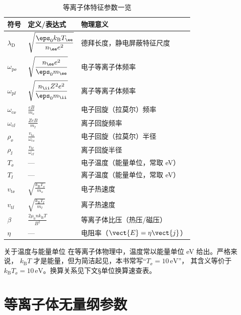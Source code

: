 \begin{table}[htbp]
\centering
\caption{等离子体特征参数一览}
\begin{tabular}{@{}llp{6.5cm}@{}}
\toprule
\textbf{符号} & \textbf{定义/表达式} & \textbf{物理意义} \\
\midrule
$\lambda_\mathrm{D}$ & $\displaystyle\sqrt{\frac{\eps_0 k_\mathrm{B} T_\ee}{n_\ee e^2}}$ & 德拜长度，静电屏蔽特征尺度 \\
$\omega_{\mathrm{p}\ee}$ & $\displaystyle\sqrt{\frac{n_\ee e^2}{\eps_0 m_\ee}}$ & 电子等离子体频率 \\
$\omega_{\mathrm{p}\ii}$ & $\displaystyle\sqrt{\frac{n_\ii Z^2 e^2}{\eps_0 m_\ii}}$ & 离子等离子体频率 \\
$\omega_{\mathrm{c}\ee}$ & $\displaystyle\frac{e B}{m_\ee}$ & 电子回旋（拉莫尔）频率 \\
$\omega_{\mathrm{c}\ii}$ & $\displaystyle\frac{Z e B}{m_\ii}$ & 离子回旋频率 \\
$\rho_\ee$ & $\displaystyle\frac{v_{\mathrm{t}\ee}}{\omega_{\mathrm{c}\ee}}$ & 电子回旋（拉莫尔）半径 \\
$\rho_\ii$ & $\displaystyle\frac{v_{\mathrm{t}\ii}}{\omega_{\mathrm{c}\ii}}$ & 离子回旋半径 \\
$T_\ee$ & — & 电子温度（能量单位，常取 eV） \\
$T_\ii$ & — & 离子温度（能量单位，常取 eV） \\
$v_{\mathrm{t}\ee}$ & $\displaystyle\sqrt{\frac{k_\mathrm{B} T_\ee}{m_\ee}}$ & 电子热速度 \\
$v_{\mathrm{t}\ii}$ & $\displaystyle\sqrt{\frac{k_\mathrm{B} T_\ii}{m_\ii}}$ & 离子热速度 \\
$\beta$ & $\displaystyle\frac{2\mu_0 n k_\mathrm{B} T}{B^2}$ & 等离子体比压（热压/磁压） \\
$\eta$ & — & 电阻率（$\vect{E}=\eta\vect{j}$） \\
\bottomrule
\end{tabular}
\end{table}

\begin{insight}{关于温度与能量单位}{}
在等离子体物理中，温度常以能量单位 eV 给出。严格来说，
$k_\mathrm{B} T$ 才是能量，但为简洁起见，本书常写“$T_\ee=10\,\mathrm{eV}$”，
其含义等价于 $k_\mathrm{B} T_\ee=10\,\mathrm{eV}$。换算关系见下文\S 单位换算速查表。
\end{insight}


\section*{等离子体无量纲参数}

